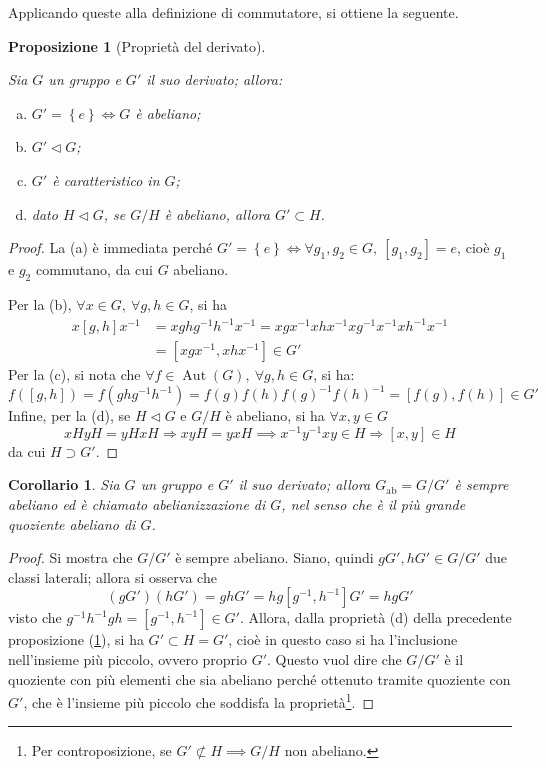 \documentclass[12pt]{scrartcl}
\theoremstyle{style}
\newtheorem{prop}{Proposizione}[section]
\newtheorem{corollario}{Corollario}[teorema]
\numberwithin{equation}{subsection}
\begin{document}
Applicando queste alla definizione di commutatore, si ottiene la seguente.
\begin{prop}[Propriet\`a del derivato]\label{propderiv}
	
	Sia $G$ un gruppo e $G'$ il suo derivato; allora:
	\begin{enumerate}[(a).]
		\item $G ' = \left\{ e \right\}  \iff G$ \`e abeliano;
		\item $G' \lhd G$;
		\item $G'$ \`e caratteristico in $G$;
		\item dato $H \lhd G$, se $G / H$ \`e abeliano, allora $G' \subset H$.
	\end{enumerate}
\end{prop}
	\begin{proof}
		La (a) \`e immediata perch\'e $G' = \left\{ e \right\} \iff \forall g_1,g_2 \in G, \ [g_1,g_2] = e $, cio\`e $g_1$ e $g_2$ commutano, da cui $G$ abeliano.

		Per la (b), $\forall x \in G, \ \forall g,h \in G $, si ha 
		\[
			\begin{split}
				x[g,h]x^{-1}  &= xghg^{-1}h^{-1}x^{-1}= xgx^{-1}xhx^{-1}xg^{-1}x^{-1}xh^{-1}x^{-1}\\
					      &=[xgx^{-1}, xhx^{-1}] \in G'
			\end{split}
		\] 
	Per la (c), si nota che $\forall f \in \operatorname{Aut} (G), \ \forall g,h \in G$, si ha:
	\[
		f([g,h]) = f(ghg^{-1}h^{-1}) = f(g) f(h) f(g)^{-1} f(h)^{-1} = [f(g), f(h)] \in G'
	\] 
	Infine, per la (d), se $H \lhd G$ e $G / H$ \`e abeliano, si ha $\forall x,y \in G$
	\[
		xHyH =yH xH\Rightarrow xyH = yxH \implies x^{-1}y^{-1}xy \in H \Rightarrow [x,y] \in H
	\] 
	da cui $H \supset G' $.
	\end{proof}
\begin{corollario}
	Sia $G$ un gruppo e $G'$ il suo derivato; allora $G_\text{ab}= G / G'$ \`e sempre abeliano ed \`e chiamato \textit{abelianizzazione} di $G$, nel senso che \`e il pi\`u grande quoziente abeliano di $G$.
\end{corollario}
	\begin{proof}
		Si mostra che $G / G'$ \`e sempre abeliano. 
		Siano, quindi $gG', hG' \in G / G'$ due classi laterali; allora si osserva che
		\[
			(gG') (hG') = ghG' = hg [g^{-1},h^{-1}] G' = hg G'
		\] 
		visto che $g^{-1}h^{-1}gh=[g^{-1},h^{-1}] \in G'$.
		Allora, dalla propriet\`a (d) della precedente proposizione (\ref{propderiv}), si ha $G' \subset H =G'$, cio\`e in questo caso si ha l'inclusione nell'insieme pi\`u piccolo, ovvero proprio $G'$. 
		Questo vuol dire che $G /G'$ \`e il quoziente con pi\`u elementi che sia abeliano perch\'e ottenuto tramite quoziente con $G'$, che \`e l'insieme pi\`u piccolo che soddisfa la propriet\`a\footnote{Per controposizione, se $G'\not\subset H\implies G/H$ non abeliano.}.
	\end{proof}
\end{document}
